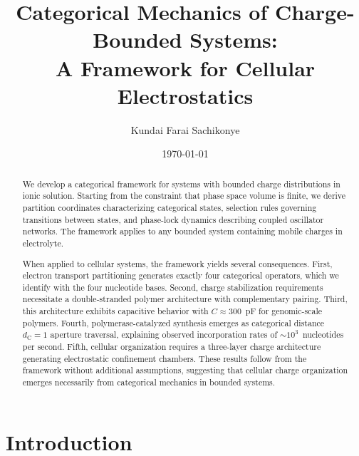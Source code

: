 \documentclass[twocolumn,aps,prb,superscriptaddress,longbibliography,floatfix]{revtex4-2}
\theoremstyle{remark}
\newcommand{\dC}{d_\text{C}}
\begin{document}
\title{Categorical Mechanics of Charge-Bounded Systems:\\
A Framework for Cellular Electrostatics}

\author{Kundai Farai Sachikonye}

\date{\today}

\begin{abstract}
We develop a categorical framework for systems with bounded charge
distributions in ionic solution. Starting from the constraint that phase
space volume is finite, we derive partition coordinates characterizing
categorical states, selection rules governing transitions between states,
and phase-lock dynamics describing coupled oscillator networks. The
framework applies to any bounded system containing mobile charges in
electrolyte.

When applied to cellular systems, the framework yields several
consequences. First, electron transport partitioning generates exactly
four categorical operators, which we identify with the four nucleotide
bases. Second, charge stabilization requirements necessitate a
double-stranded polymer architecture with complementary pairing. Third,
this architecture exhibits capacitive behavior with $C \approx 300$~pF
for genomic-scale polymers. Fourth, polymerase-catalyzed synthesis
emerges as categorical distance $\dC = 1$ aperture traversal, explaining
observed incorporation rates of $\sim$$10^3$~nucleotides per second.
Fifth, cellular organization requires a three-layer charge architecture
generating electrostatic confinement chambers. These results follow from
the framework without additional assumptions, suggesting that cellular
charge organization emerges necessarily from categorical mechanics in
bounded systems.
\end{abstract}

\maketitle

\section{Introduction}
\label{sec:introduction}
\end{document}
